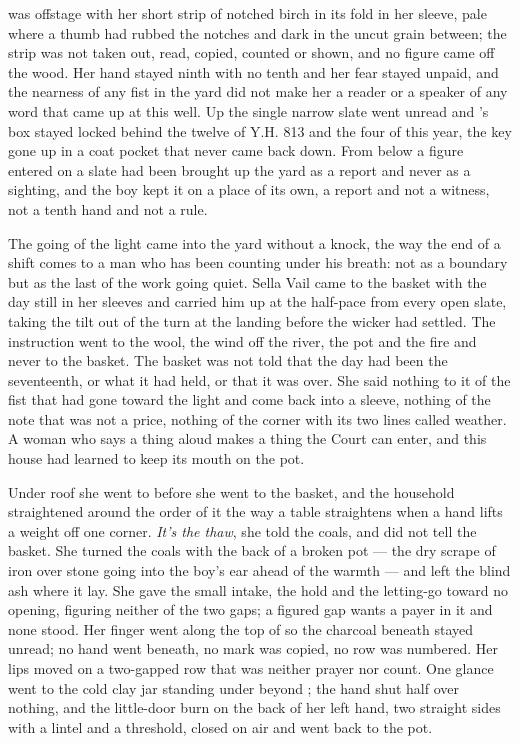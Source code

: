  was offstage with her short strip of notched birch in its fold in her sleeve, pale where a thumb had rubbed the notches and dark in the uncut grain between; the strip was not taken out, read, copied, counted or shown, and no figure came off the wood. Her hand stayed ninth with no tenth and her fear stayed unpaid, and the nearness of any fist in the yard did not make her a reader or a speaker of any word that came up at this well. Up  the single narrow slate went unread and 's box stayed locked behind the twelve of Y.H. 813 and the four of this year, the key gone up in a coat pocket that never came back down. From  below  a figure entered on a slate had been brought up the yard as a report and never as a sighting, and the boy kept it on a place of its own, a report and not a witness, not a tenth hand and not a rule.

\scenebreak

The going of the light came into the yard without a knock, the way the end of a shift comes to a man who has been counting under his breath: not as a boundary but as the last of the work going quiet. Sella Vail came to the basket with the day still in her sleeves and carried him up  at the half-pace from every open slate, taking the tilt out of the turn at the landing before the wicker had settled. The instruction went to the wool, the wind off the river, the pot and the fire and never to the basket. The basket was not told that the day had been the seventeenth, or what it had held, or that it was over. She said nothing to it of the fist that had gone toward the light and come back into a sleeve, nothing of the note that was not a price, nothing of the corner with its two lines called weather. A woman who says a thing aloud makes a thing the Court can enter, and this house had learned to keep its mouth on the pot.

Under  roof she went to  before she went to the basket, and the household straightened around the order of it the way a table straightens when a hand lifts a weight off one corner. \emph{It's the thaw}, she told the coals, and did not tell the basket. She turned the coals with the back of a broken pot --- the dry scrape of iron over stone going into the boy's ear ahead of the warmth --- and left the blind ash where it lay. She gave the small intake, the hold and the letting-go toward no opening, figuring neither of the two gaps; a figured gap wants a payer in it and none stood. Her finger went along the top of  so the charcoal beneath stayed unread; no hand went beneath, no mark was copied, no row was numbered. Her lips moved on a two-gapped row that was neither prayer nor count. One glance went to the cold clay jar standing under  beyond ; the hand shut half over nothing, and the little-door burn on the back of her left hand, two straight sides with a lintel and a threshold, closed on air and went back to the pot.

